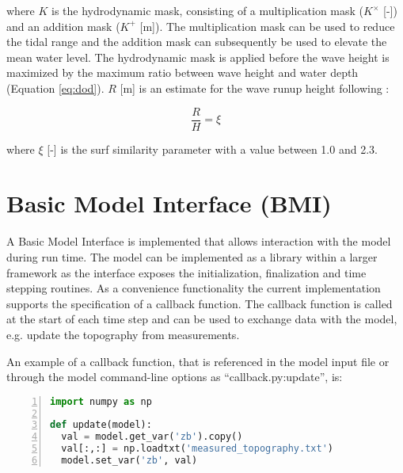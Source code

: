 \noindent where $K$ is the hydrodynamic mask, consisting of a
multiplication mask ($K^{\mathrm{\times}}$ [-]) and an addition mask
($K^{\mathrm{+}}$ [m]). The multiplication mask can be used to reduce
the tidal range and the addition mask can subsequently be used to
elevate the mean water level. The hydrodynamic mask is applied before
the wave height is maximized by the maximum ratio between wave height
and water depth (Equation \ref{eq:dod}). $R$ [m] is an estimate for
the wave runup height following \citet{Battjes1974}:

\begin{equation}
  \label{eq:battjes}
  \frac{R}{H} = \xi
\end{equation}

\noindent where $\xi$ [-] is the surf similarity parameter with a
value between 1.0 and 2.3.

\section{Basic Model Interface (BMI)}
\label{apx:bmi}

A Basic Model Interface \citep[BMI,][]{Peckham2013} is implemented
that allows interaction with the model during run time. The model can
be implemented as a library within a larger framework as the interface
exposes the initialization, finalization and time stepping
routines. As a convenience functionality the current implementation
supports the specification of a callback function. The callback
function is called at the start of each time step and can be used to
exchange data with the model, e.g. update the topography from
measurements.

An example of a callback function, that is referenced in the model
input file or through the model command-line options as
``callback.py:update'', is:

\begin{lstlisting}[language=Python,title=callback.py,frame=single,numbers=left]
import numpy as np

def update(model):
  val = model.get_var('zb').copy()
  val[:,:] = np.loadtxt('measured_topography.txt')
  model.set_var('zb', val)
\end{lstlisting}

